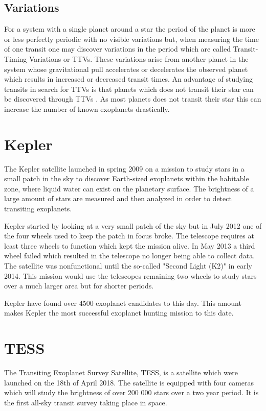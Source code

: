 \documentclass[12pt]{report}
\begin{document}
\subsection{Variations}
\label{sec:trans_vari}

	For a system with a single planet around a star the period of the planet is more or less perfectly periodic with no visible variations but, when measuring the time of one transit one may discover variations in the period which are called Transit-Timing Variations or TTVs. These variations arise from another planet in the system whose gravitational pull accelerates or decelerates the observed planet which results in increased or decreased transit times. An advantage of studying transits in search for TTVs is that planets which does not transit their star can be discovered through TTVs \citep{0004-637X-777-1-3}. As most planets does not transit their star this can increase the number of known exoplanets drastically.

\section{Kepler}
	The Kepler satellite launched in spring 2009 on a mission to study stars in a small patch in the sky to discover Earth-sized exoplanets within the habitable zone, where liquid water can exist on the planetary surface. The brightness of a large amount of stars are measured and then analyzed in order to detect transiting exoplanets. 
	
	Kepler started by looking at a very small patch of the sky but in July 2012 one of the four wheels used to keep the patch in focus broke. The telescope requires at least three wheels to function which kept the mission alive. In May 2013 a third wheel failed which resulted in the telescope no longer being able to collect data. The satellite was nonfunctional until the so-called "Second Light (K2)" in early 2014. This mission would use the telescopes remaining two wheels to study stars over a much larger area but for shorter periods. \citep{2017PAPhS.161...38B}
	
	Kepler have found over 4500 exoplanet candidates \citep{2017PAPhS.161...38B} to this day. This amount makes Kepler the most successful exoplanet hunting mission to this date.
	
	
\section{TESS}
	The Transiting Exoplanet Survey Satellite, TESS, is a satellite which were launched on the 18th of April 2018. The satellite is equipped with four cameras which will study the brightness of over 200 000 stars over a two year period. It is the first all-sky transit survey taking place in space. \citep{2014SPIE.9143E..20R}
	
\end{document}
